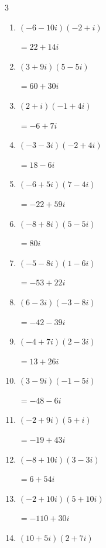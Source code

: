 \begin{multicols}{3}
\begin{enumerate}
  \item $\displaystyle (-6-10i)(-2+i)$

        $\displaystyle =22+14i$

  \item $\displaystyle (3+9i)(5-5i)$

        $\displaystyle =60+30i$

  \item $\displaystyle (2+i)(-1+4i)$

        $\displaystyle =-6+7i$

  \item $\displaystyle (-3-3i)(-2+4i)$

        $\displaystyle =18-6i$

\columnbreak %

  \item $\displaystyle (-6+5i)(7-4i)$

        $\displaystyle =-22+59i$

  \item $\displaystyle (-8+8i)(5-5i)$

        $\displaystyle =80i$

  \item $\displaystyle (-5-8i)(1-6i)$

        $\displaystyle =-53+22i$

  \item $\displaystyle (6-3i)(-3-8i)$

        $\displaystyle =-42-39i$

  \item $\displaystyle (-4+7i)(2-3i)$

        $\displaystyle =13+26i$

  \item $\displaystyle (3-9i)(-1-5i)$

        $\displaystyle =-48-6i$

  \item $\displaystyle (-2+9i)(5+i)$

        $\displaystyle =-19+43i$

  \item $\displaystyle (-8+10i)(3-3i)$

        $\displaystyle =6+54i$

  \item $\displaystyle (-2+10i)(5+10i)$

        $\displaystyle =-110+30i$

  \item $\displaystyle (10+5i)(2+7i)$


\end{enumerate}
\end{multicols}
